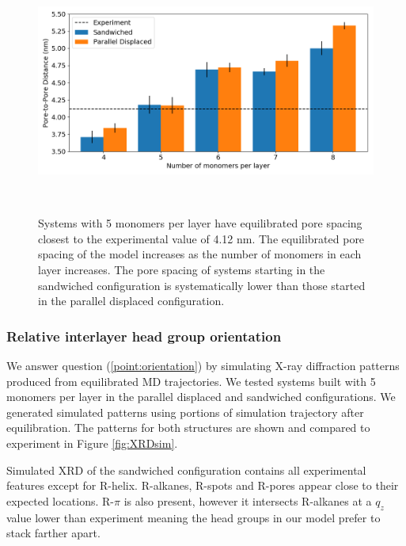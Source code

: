 \documentclass[journal=jpcbfk,manusciprt=article]{achemso}
\begin{document}
  \begin{figure}
	\centering
	\includegraphics[width=\linewidth]{p2p.png}
	\caption{Systems with 5 monomers per layer have
		equilibrated pore spacing closest to the experimental value of 4.12 nm. The
			equilibrated pore spacing of the model increases as the number of monomers in
			each layer increases. The pore spacing of systems starting in the sandwiched
			configuration is systematically lower than those started in the parallel
			displaced configuration.}~\label{fig:p2p}
  \end{figure}  

  \subsubsection{Relative interlayer head group orientation}

  We answer question (\ref{point:orientation}) by simulating X-ray diffraction
  patterns produced from equilibrated MD trajectories. We tested systems built
  with 5 monomers per layer in the parallel displaced and sandwiched
  configurations. We generated simulated patterns using portions of simulation
  trajectory after equilibration. The patterns for both structures are shown and
  compared to experiment in Figure \ref{fig:XRDsim}.

  Simulated XRD of the sandwiched configuration contains all experimental
  features except for R-helix. R-alkanes, R-spots and R-pores appear close to their
  expected locations. R-$\pi$ is also present, however it intersects R-alkanes at
  a $q_z$ value lower than experiment meaning the head groups in our model prefer 
  to stack farther apart. 
\end{document}
